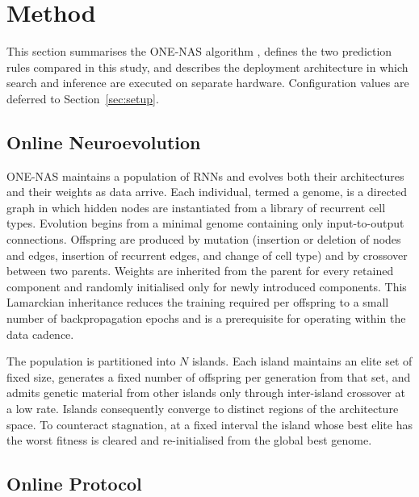 \section{Method}
\label{sec:method}

This section summarises the ONE-NAS algorithm \cite{lyu2023onenas},
defines the two prediction rules compared in this study, and describes
the deployment architecture in which search and inference are executed
on separate hardware. Configuration values are deferred to
Section~\ref{sec:setup}.

\subsection{Online Neuroevolution}

ONE-NAS maintains a population of RNNs and evolves both their
architectures and their weights as data arrive. Each individual, termed
a genome, is a directed graph in which hidden nodes are instantiated
from a library of recurrent cell types. Evolution begins from a minimal
genome containing only input-to-output connections. Offspring are
produced by mutation (insertion or deletion of nodes and edges,
insertion of recurrent edges, and change of cell type) and by crossover
between two parents. Weights are inherited from the parent for every
retained component and randomly initialised only for newly introduced
components. This Lamarckian inheritance reduces the training required
per offspring to a small number of backpropagation epochs and is a
prerequisite for operating within the data cadence.

The population is partitioned into $N$ islands. Each island maintains an
elite set of fixed size, generates a fixed number of offspring per
generation from that set, and admits genetic material from other
islands only through inter-island crossover at a low rate. Islands
consequently converge to distinct regions of the architecture space. To
counteract stagnation, at a fixed interval the island whose best elite
has the worst fitness is cleared and re-initialised from the global
best genome.

\subsection{Online Protocol}

